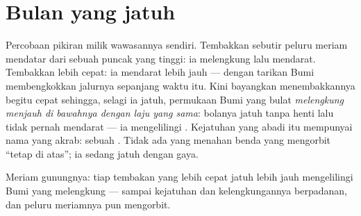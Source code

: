\section{Bulan yang jatuh}

\begin{example}\label{ex:g9:gravitation:cannon}
Percobaan pikiran milik wawasannya sendiri. Tembakkan sebutir peluru
meriam mendatar dari sebuah puncak yang tinggi: ia melengkung lalu
mendarat. Tembakkan lebih cepat: ia mendarat lebih jauh --- dengan
tarikan Bumi membengkokkan jalurnya sepanjang waktu itu. Kini
bayangkan menembakkannya begitu cepat sehingga, selagi ia jatuh,
permukaan Bumi yang bulat \emph{melengkung menjauh di bawahnya dengan
laju yang sama}: bolanya jatuh tanpa henti lalu tidak pernah mendarat
--- ia mengelilingi . Kejatuhan yang abadi itu mempunyai nama
yang akrab: sebuah \emph{}. Tidak ada yang menahan benda yang
mengorbit ``tetap di atas''; ia sedang jatuh dengan gaya.
\end{example}

\begin{omfigure}

{\small Meriam gunungnya: tiap tembakan yang lebih cepat jatuh lebih
jauh mengelilingi Bumi yang melengkung --- sampai kejatuhan dan
kelengkungannya berpadanan, dan peluru meriamnya pun mengorbit.}
\end{omfigure}

